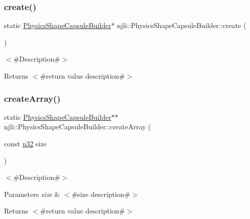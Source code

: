 \subsubsection{\texorpdfstring{create()}{create()}}
{\footnotesize\ttfamily static \mbox{\hyperlink{classnjli_1_1_physics_shape_capsule_builder}{Physics\+Shape\+Capsule\+Builder}}$\ast$ njli\+::\+Physics\+Shape\+Capsule\+Builder\+::create (\begin{DoxyParamCaption}{ }\end{DoxyParamCaption})\hspace{0.3cm}{\ttfamily [static]}}

$<$\#\+Description\#$>$

\begin{DoxyReturn}{Returns}
$<$\#return value description\#$>$ 
\end{DoxyReturn}
\mbox{\label{classnjli_1_1_physics_shape_capsule_builder_a470b4bb9f3fa3294ad0d6f18aed1ab4c}} 
\subsubsection{\texorpdfstring{create\+Array()}{createArray()}}
{\footnotesize\ttfamily static \mbox{\hyperlink{classnjli_1_1_physics_shape_capsule_builder}{Physics\+Shape\+Capsule\+Builder}}$\ast$$\ast$ njli\+::\+Physics\+Shape\+Capsule\+Builder\+::create\+Array (\begin{DoxyParamCaption}\item[{const \mbox{\hyperlink{_util_8h_a10e94b422ef0c20dcdec20d31a1f5049}{u32}}}]{size }\end{DoxyParamCaption})\hspace{0.3cm}{\ttfamily [static]}}

$<$\#\+Description\#$>$


\begin{DoxyParams}{Parameters}
{\em size} & $<$\#size description\#$>$\\
\hline
\end{DoxyParams}
\begin{DoxyReturn}{Returns}
$<$\#return value description\#$>$ 
\end{DoxyReturn}
\mbox{\label{classnjli_1_1_physics_shape_capsule_builder_af369946b7504220b7cdb5bd59cc0ac31}} 
